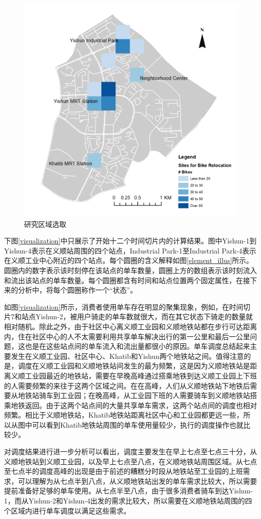 \documentclass[]{tongjithesis}
\numberwithin{equation}{chapter}
\begin{document}
\begin{figure}[H]
    \centering
    \includegraphics[width=0.5 \textwidth]{figures_main/selected_nodes10.png}
    \caption{研究区域选取}
    \label{selected10}
\end{figure}

下图\ref{visualization}中只展示了开始十二个时间切片内的计算结果。图中Yishun-1到Yishun-4表示在义顺站周围的四个站点，Industrial Park-1至Industrial Park-4表示在义顺工业中心附近的四个站点。每个圆圈的含义解释如图\ref{element_illus}所示。圆圈内的数字表示该时刻停在该站点的单车数量，圆圈上方的数组表示该时刻流入和流出该站点的单车数量。每个圆圈都含有时间和站点位置两个固定属性，在接下来的分析中，将每个圆圈称作一个“状态”。

如图\ref{visualization}所示，消费者使用单车存在明显的聚集现象，例如，在时间切片7和站点Yishun-2，被用户骑走的单车数就很大，而在其它状态下骑走的数量就相对随机。除此之外，由于社区中心离义顺工业园和义顺地铁站都在步行可达距离内，住在社区中心的人不太需要利用共享单车解决出行的第一公里和最后一公里问题，这也是在这些站点间的单车流入和流出量都很小的原因。单车调度总结起来主要发生在义顺工业园、社区中心、Khatib和Yishun两个地铁站之间。值得注意的是，调度在义顺工业园和义顺地铁站间发生的最为频繁，这是因为义顺地铁站是距离义顺工业园最近的地铁站，需要在早晚高峰通过搭乘地铁到达义顺工业园上下班的人需要频繁的来往于这两个区域之间。在在高峰，人们从义顺地铁站下地铁后需要从地铁站骑车到工业园；在晚高峰，从工业园下班的人需要骑车到义顺地铁站搭乘地铁返回。由于这两个站点间的大量共享单车需求，这两个站点间的调度也相对频繁。相比于义顺地铁站，Khatib地铁站距离社区中心和工业园都更远一些，所以从图中可以看到Khatib地铁站周围的单车使用量较少，执行的调度操作也就比较少。

对调度结果进行进一步分析可以看出，调度主要发生在早上七点至七点三十分，从义顺地铁站到义顺工业园，以及早上七点至八点，在义顺地铁站周围区域。从七点至七点半的调度高峰的出现是由于前述的糟糕分时段从地铁站至工业园的上班需求，可以理解为从七点半到八点，从义顺地铁站出发的单车需求比较大，所以需要提前准备好足够的单车使用。从七点半至八点，由于很多消费者骑车到达Yishun-1，而从Yishun-2和Yishun-4出发的需求比较大，所以需要在义顺地铁站周围的四个区域内进行单车调度以满足这些需求。
\end{document}
